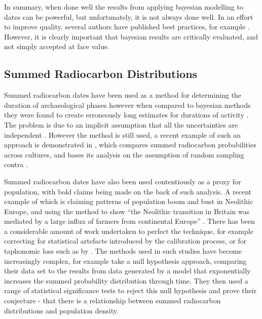 In summary, when done well the results from applying bayesian modelling to dates can be powerful, but unfortunately, it is not always done well. In an effort to improve quality, several authors have published best practices, for example \citet{doi:10.1080/00438243.2015.1067640}. However, it is clearly important that bayesian results are critically evaluated, and not simply accepted at face value. 

\subsection{Summed Radiocarbon Distributions}
Summed radiocarbon dates have been used as a method for determining the duration of archaeological phases \citep[9]{CAJ:676108} however when compared to bayesian methods they were found to create erroneously long estimates for durations of activity \citep[10]{CAJ:676108}. The problem is due to an implicit assumption that all the uncertainties are independent \citep[11]{CAJ:676108}. However the method is still used, a recent example of such an approach is demonstrated in \citet{AQY:9508563}, which compares summed radiocarbon probabilities across cultures, and bases its analysis on the assumption of random sampling \citep[1079]{AQY:9508563} contra \citet{CAJ:676108}. 

Summed radiocarbon dates have also been used contentiously as a proxy for population, with bold claims being made on the back of such analysis. A recent example of which is \citet{Shennan:2013fk} claiming patterns of population boom and bust in Neolithic Europe, and \citet{Collard2010866} using the method to show ``the Neolithic transition in Britain was mediated by a large influx of farmers from continental Europe''  \citep[869]{Collard2010866}. There has been a considerable amount of work undertaken to perfect the technique, for example correcting for statistical artefacts introduced by the calibration process, or for taphonomic loss such as by \citet{Williams2012578}. The methods used in such studies have become increasingly complex, for example \citet{Shennan:2013fk} take a null hypothesis approach, comparing their data set to the results from data generated by a model that exponentially increases the summed probability distribution through time. They then used a range of statistical significance tests to reject this null hypothesis and prove their conjecture - that there is a relationship between summed radiocarbon distributions and population density. 

